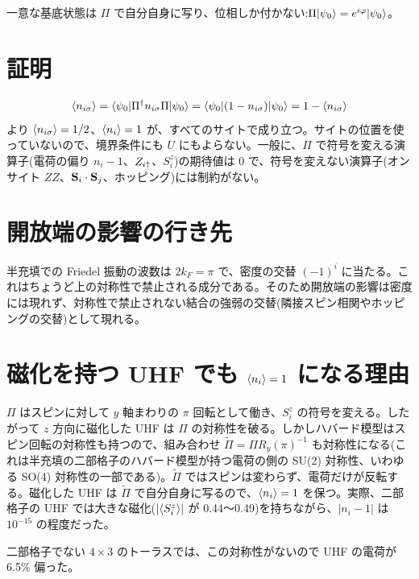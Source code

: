 一意な基底状態は $\Pi$ で自分自身に写り、位相しか付かない:$\Pi|\psi_0\rangle=e^{i\varphi}|\psi_0\rangle$。

\section{証明}
\begin{equation}
  \langle n_{i\sigma}\rangle=\langle \psi_0|\Pi^\dagger n_{i\sigma}\Pi|\psi_0\rangle=\langle \psi_0|(1-n_{i\sigma})|\psi_0\rangle=1-\langle n_{i\sigma}\rangle
\end{equation}
より $\langle n_{i\sigma}\rangle=1/2$、$\langle n_i\rangle=1$ が、すべてのサイトで成り立つ。サイトの位置を使っていないので、境界条件にも $U$ にもよらない。一般に、$\Pi$ で符号を変える演算子(電荷の偏り $n_i-1$、$Z_{i\uparrow}$、$S^z_i$)の期待値は 0 で、符号を変えない演算子(オンサイト $ZZ$、$\mathbf S_i\cdot\mathbf S_j$、ホッピング)には制約がない。

\section{開放端の影響の行き先}
半充填での Friedel 振動の波数は $2k_F=\pi$ で、密度の交替 $(-1)^i$ に当たる。これはちょうど上の対称性で禁止される成分である。そのため開放端の影響は密度には現れず、対称性で禁止されない結合の強弱の交替(隣接スピン相関やホッピングの交替)として現れる。

\section{磁化を持つ UHF でも $\langle n_i\rangle=1$ になる理由}
$\Pi$ はスピンに対して $y$ 軸まわりの $\pi$ 回転として働き、$S^z_i$ の符号を変える。したがって $z$ 方向に磁化した UHF は $\Pi$ の対称性を破る。しかしハバード模型はスピン回転の対称性も持つので、組み合わせ $\tilde\Pi=\Pi R_y(\pi)^{-1}$ も対称性になる(これは半充填の二部格子のハバード模型が持つ電荷の側の SU(2) 対称性、いわゆる SO(4) 対称性\cite{yangzhang1990}の一部である)。$\tilde\Pi$ ではスピンは変わらず、電荷だけが反転する。磁化した UHF は $\tilde\Pi$ で自分自身に写るので、$\langle n_i\rangle=1$ を保つ。実際、二部格子の UHF では大きな磁化($\lvert\langle S^z_i\rangle\rvert$ が 0.44〜0.49)を持ちながら、$\lvert n_i-1\rvert$ は $10^{-15}$ の程度だった。

二部格子でない $4\times3$ のトーラスでは、この対称性がないので UHF の電荷が 6.5\% 偏った。
